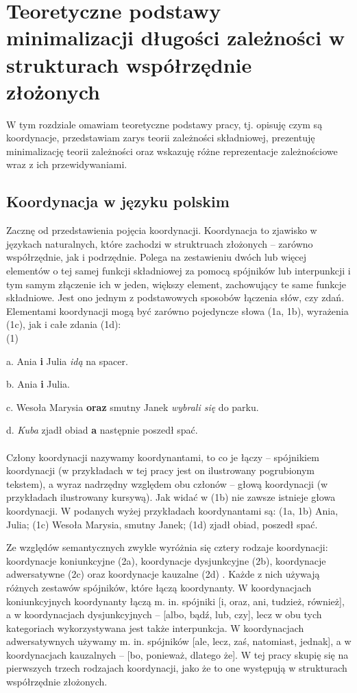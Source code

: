 \documentclass[licencjacka]{pracamgr_Kogni}
\begin{document}
\chapter{Teoretyczne podstawy minimalizacji długości zależności w strukturach współrzędnie złożonych}
W tym rozdziale omawiam teoretyczne podstawy pracy, tj. opisuję czym są koordynacje, przedstawiam zarys teorii zależności składniowej, prezentuję minimalizację teorii zależności oraz wskazuję różne reprezentacje zależnościowe wraz z ich przewidywaniami.

\section{Koordynacja w języku polskim}
Zacznę od przedstawienia pojęcia koordynacji. Koordynacja to zjawisko w językach naturalnych, które zachodzi w struktruach złożonych -- zarówno współrzędnie, jak i podrzędnie. Polega na zestawieniu dwóch lub więcej elementów o tej samej funkcji składniowej za pomocą spójników lub interpunkcji i tym samym złączenie ich w jeden, większy element, zachowujący te same funkcje składniowe. Jest ono jednym z podstawowych sposobów łączenia słów, czy zdań. Elementami koordynacji mogą być zarówno pojedyncze słowa (1a, 1b),  wyrażenia (1c), jak i całe zdania (1d):
\\

(1)

a. Ania \textbf{i} Julia \textit{idą} na spacer.

b. Ania \textbf{i} Julia.

c. Wesoła Marysia \textbf{oraz} smutny Janek \textit{wybrali się} do parku.

d. \textit{Kuba} zjadł obiad \textbf{a} następnie poszedł spać.
\\
\\
Człony koordynacji nazywamy koordynantami, to co je łączy -- spójnikiem koordynacji (w przykładach w tej pracy jest on ilustrowany pogrubionym tekstem), a wyraz nadrzędny względem obu członów -- głową koordynacji (w przykładach ilustrowany kursywą). Jak widać w (1b) nie zawsze istnieje głowa koordynacji.
W podanych wyżej przykładach koordynantami są: (1a, 1b) Ania, Julia; (1c) Wesoła Marysia, smutny Janek; (1d) zjadł obiad, poszedł spać.

Ze względów semantycznych zwykle wyróżnia się cztery rodzaje koordynacji: koordynacje koniunkcyjne (2a), koordynacje dysjunkcyjne (2b), koordynacje adwersatywne (2c) oraz koordynacje kauzalne (2d) \citep{Haspelmath2007}. Każde z nich używają różnych zestawów spójników, które łączą koordynanty. W koordynacjach koniunkcyjnych koordynanty łączą m. in. spójniki [i, oraz, ani, tudzież, również], a w koordynacjach dysjunkcyjnych -- [albo, bądź, lub, czy], lecz w obu tych kategoriach wykorzystywana jest także interpunkcja. W koordynacjach adwersatywnych używamy m. in. spójników [ale, lecz, zaś, natomiast, jednak], a w koordynacjach kauzalnych -- [bo, ponieważ, dlatego że]. W tej pracy skupię się na pierwszych trzech rodzajach koordynacji, jako że to one występują w strukturach współrzędnie złożonych.
\\
\end{document}
